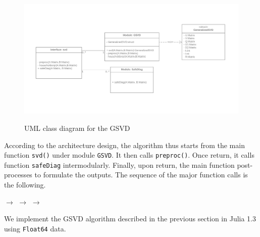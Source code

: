 	\begin{figure}[H]
        \centering
        \includegraphics[width=0.75\linewidth]{fig/GSVD_class.png}
        \label{uml-class}
        \caption{UML class diagram for the GSVD}
    \end{figure}

According to the architecture design, the algorithm thus starts from the main function \texttt{svd()} under module \texttt{GSVD}. It then calls \texttt{preproc()}. Once return, it calls function \texttt{safeDiag} intermodularly. Finally, upon return, the main function post-processes to formulate the outputs. The sequence of the major function calls is the following. 

\begin{center}
     $\rightarrow$  $\rightarrow$  $\rightarrow$ 
\end{center}

We implement the GSVD algorithm described in the previous section in Julia 1.3 using \texttt{Float64} data. 

